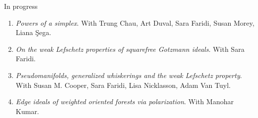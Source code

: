 \documentclass[12pt]{resume} %
\begin{document}
\begin{rSection}{In progress}

    \begin{enumerate}
        \item \textit{Powers of a simplex}. With Trung Chau, Art Duval, Sara Faridi, Susan Morey, Liana \c{S}ega.
        \item \textit{On the weak Lefschetz properties of squarefree Gotzmann ideals}. With Sara Faridi. 
        \item \textit{Pseudomanifolds, generalized whiskerings and the weak Lefschetz property}. With Susan M. Cooper, Sara Faridi, Lisa Nicklasson, Adam Van Tuyl. 
        \item \textit{Edge ideals of weighted oriented forests via polarization}. With Manohar Kumar. 
    \end{enumerate}
\end{rSection}

\newpage
\end{document}

